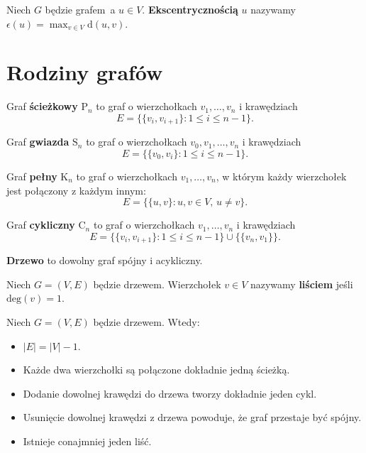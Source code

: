 \begin{definition}
Niech $G$ będzie grafem\ a $u\in V$. \textbf{Ekscentrycznością} $u$ nazywamy $\epsilon(u) = \max_{v\in V} \mathrm{d}(u,v)$.    
\end{definition}

\section{Rodziny grafów}

\begin{definition}
Graf \textbf{ścieżkowy} $\mathrm{P}_n$ to graf o wierzchołkach $v_1, \dots, v_n$ i krawędziach
\[
E = \{\{v_i, v_{i+1}\} : 1 \le i \le n-1\}.
\]
\end{definition}

\begin{definition}
Graf \textbf{gwiazda} $\mathrm{S}_n$ to graf o wierzchołkach $v_0, v_1, \dots, v_n$ i krawędziach
\[
E = \{\{v_0, v_{i}\} : 1 \le i \le n-1\}.
\]
\end{definition}

\begin{definition}
Graf \textbf{pełny} $\mathrm{K}_n$ to graf o wierzchołkach $v_1, \dots, v_n$, w którym każdy wierzchołek jest połączony z każdym innym:
\[
E = \{\{u, v\} : u, v \in V,\, u \neq v\}.
\]
\end{definition}

\begin{definition}
Graf \textbf{cykliczny} $\mathrm{C}_n$ to graf o wierzchołkach $v_1, \dots, v_n$ i krawędziach
\[
E = \{\{v_i, v_{i+1}\} : 1 \le i \le n-1\} \cup \{\{v_n, v_1\}\}.
\]
\end{definition}

\begin{definition}
\textbf{Drzewo} to dowolny graf spójny i acykliczny.
\end{definition}

\begin{definition}
    Niech $G=(V,E)$ będzie drzewem. Wierzchołek $v\in V$ nazywamy \textbf{liściem} jeśli $\mathrm{deg}(v)=1$.   
\end{definition}

\begin{fact}\label{F:tree_properties}
Niech $G=(V,E)$ będzie drzewem. Wtedy:
\begin{itemize}
    \item $|E|=|V|-1$.
    \item Każde dwa wierzchołki są połączone dokładnie jedną ścieżką.
    \item Dodanie dowolnej krawędzi do drzewa tworzy dokładnie jeden cykl.
    \item Usunięcie dowolnej krawędzi z drzewa powoduje, że graf przestaje być spójny.
    \item Istnieje conajmniej jeden liść.
\end{itemize}
\end{fact}

